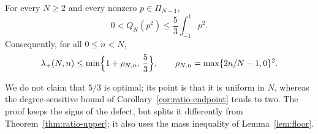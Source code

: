 \documentclass{siamart251216}
\newcommand{\Pn}{\Pi}
\begin{document}
\begin{theorem}\label{thm:five-thirds}
For every $N\ge2$ and every nonzero $p\in\Pn_{N-1}$,
\[
 0<Q_N(p^2)\le\frac53\int_{-1}^1p^2 .
\]
Consequently, for all $0\le n<N$,
\[
 \lambda_+(N,n)\le\min\Bigl\{1+\rho_{N,n},\,\frac53\Bigr\},
 \qquad \rho_{N,n}=\max\{2n/N-1,0\}^2 .
\]
\end{theorem}

We do not claim that $5/3$ is optimal; its point is that it is uniform in
$N$, whereas the degree-sensitive bound of
Corollary~\ref{cor:ratio-endpoint} tends to two. The proof keeps the signs
of the defect, but splits it differently from
Theorem~\ref{thm:ratio-upper}; it also uses the mass inequality of
Lemma~\ref{lem:floor}.
\end{document}
